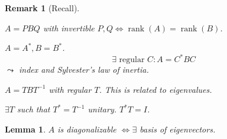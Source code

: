 \documentclass{article}
\newtheorem{lemma}{Lemma}  \numberwithin{lemma}{section}
\newtheorem{remark}{Remark}  \numberwithin{remark}{section}
\DeclareMathOperator{\rank}{rank}
\begin{document}
\begin{remark}[Recall]\hfill{}
  \begin{description}
    {\leftskip=15pt
    \item[Equivalence] $A = PBQ$ with invertible $P,Q \iff \rank(A) = \rank(B)$.
    \item[Congruence]
      $A = A^*, B = B^*$.
      \[ \exists \text{ regular } C: A = C^* BC \]
      $\leadsto$ index and Sylvester's law of inertia.
    \item[Similarity] $A = TBT^{-1}$ with regular $T$. This is related to eigenvalues.
    \item[Later on] $\exists T$ such that $T^* = T^{-1}$ unitary. $T^{*} T = I$.

    }
  \end{description}
\end{remark}

\begin{lemma} %
  $A$ is diagonalizable $\iff \exists$ basis of eigenvectors.
\end{lemma}
\end{document}
